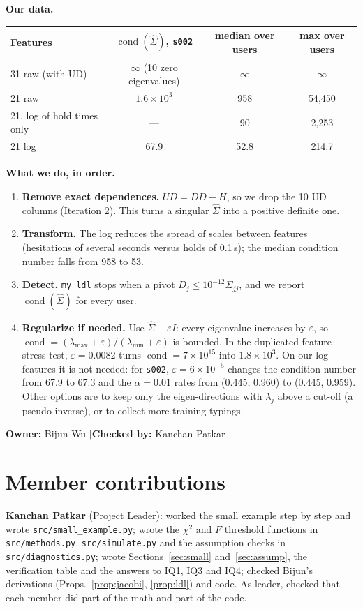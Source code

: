 \documentclass[11pt]{article}
\theoremstyle{definition}
\newcommand{\owner}[2]{\par\medskip\noindent\textbf{Owner:} #1 \quad$|$\quad \textbf{Checked by:} #2\par\medskip}
\begin{document}
\textbf{Our data.}
\begin{center}
\small
\begin{tabular}{@{}lccc@{}}
\toprule
Features & $\operatorname{cond}(\hat\Sigma)$, \texttt{s002} & median over users & max over users \\
\midrule
31 raw (with UD) & $\infty$ (10 zero eigenvalues) & $\infty$ & $\infty$ \\
21 raw & $1.6\times10^3$ & 958 & 54{,}450 \\
21, log of hold times only & --- & 90 & 2{,}253 \\
21 log & 67.9 & 52.8 & 214.7 \\
\bottomrule
\end{tabular}
\end{center}
\textbf{What we do, in order.}
\begin{enumerate}[leftmargin=*]
\item \textbf{Remove exact dependences.} $UD=DD-H$, so we drop the 10 UD columns (Iteration 2). This turns a singular $\hat\Sigma$ into a positive definite one.
\item \textbf{Transform.} The log reduces the spread of scales between features (hesitations of several seconds versus holds of 0.1\,s); the median condition number falls from 958 to 53.
\item \textbf{Detect.} \texttt{my\_ldl} stops when a pivot $D_j\le10^{-12}\hat\Sigma_{jj}$, and we report $\operatorname{cond}(\hat\Sigma)$ for every user.
\item \textbf{Regularize if needed.} Use $\hat\Sigma+\varepsilon I$: every eigenvalue increases by $\varepsilon$, so $\operatorname{cond}=(\lambda_{\max}+\varepsilon)/(\lambda_{\min}+\varepsilon)$ is bounded. In the duplicated-feature stress test, $\varepsilon=0.0082$ turns $\operatorname{cond}=7\times10^{15}$ into $1.8\times10^3$. On our log features it is not needed: for \texttt{s002}, $\varepsilon=6\times10^{-5}$ changes the condition number from 67.9 to 67.3 and the $\alpha=0.01$ rates from (0.445, 0.960) to (0.445, 0.959). Other options are to keep only the eigen-directions with $\lambda_j$ above a cut-off (a pseudo-inverse), or to collect more training typings.
\end{enumerate}
\owner{Bijun Wu}{Kanchan Patkar}

\section{Member contributions}
\textbf{Kanchan Patkar} (Project Leader): worked the small example step by step and wrote \texttt{src/small\_example.py}; wrote the $\chi^2$ and $F$ threshold functions in \texttt{src/methods.py}, \texttt{src/simulate.py} and the assumption checks in \texttt{src/diagnostics.py}; wrote Sections~\ref{sec:small} and~\ref{sec:assump}, the verification table and the answers to IQ1, IQ3 and IQ4; checked Bijun's derivations (Props.~\ref{prop:jacobi}, \ref{prop:ldl}) and code. As leader, checked that each member did part of the math and part of the code.
\end{document}
